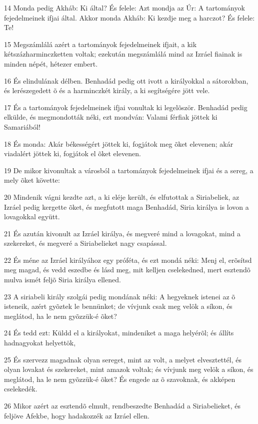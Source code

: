 \par 14 Monda pedig Akháb: Ki által? És felele: Azt mondja az Úr: A tartományok fejedelmeinek ifjai által. Akkor monda Akháb: Ki kezdje meg a harczot? És felele: Te!
\par 15 Megszámlálá azért a tartományok fejedelmeinek ifjait, a kik kétszázharminczketten voltak; ezekután megszámlálá mind az Izráel fiainak is minden népét, hétezer embert.
\par 16 És elindulának délben. Benhadád pedig ott ivott a királyokkal a sátorokban, és lerészegedett õ és a harminczkét király, a ki segítségére jött vele.
\par 17 És a tartományok fejedelmeinek ifjai vonultak ki legelõször. Benhadád pedig elkülde, és megmondották néki, ezt mondván: Valami férfiak jöttek ki Samariából!
\par 18 És monda: Akár békességért jöttek ki, fogjátok meg õket elevenen; akár viadalért jöttek ki, fogjátok el õket elevenen.
\par 19 De mikor kivonultak a városból a tartományok fejedelmeinek ifjai és a sereg, a mely õket követte:
\par 20 Mindenik vágni kezdte azt, a ki eléje került, és elfutottak a Siriabeliek, az Izráel pedig kergette õket, és megfutott maga Benhadád, Siria királya is lovon a lovagokkal együtt.
\par 21 És azután kivonult az Izráel királya, és megveré mind a lovagokat, mind a szekereket, és megveré a Siriabelieket nagy csapással.
\par 22 És méne az Izráel királyához egy próféta, és ezt mondá néki: Menj el, erõsítsd meg magad, és vedd eszedbe és lásd meg, mit kelljen cselekedned, mert esztendõ mulva ismét feljõ Siria királya ellened.
\par 23 A siriabeli király szolgái pedig mondának néki: A hegyeknek istenei az õ isteneik, azért gyõztek le bennünket; de vívjunk csak meg velök a síkon, és meglátod, ha le nem gyõzzük-é õket?
\par 24 És tedd ezt: Küldd el a királyokat, mindeniket a maga helyérõl; és állíts hadnagyokat helyettök,
\par 25 És szervezz magadnak olyan sereget, mint az volt, a melyet elvesztettél, és olyan lovakat és szekereket, mint amazok voltak; és vívjunk meg velök a síkon, és meglátod, ha le nem gyõzzük-é õket? És engede az õ szavoknak, és akképen cselekedék.
\par 26 Mikor azért az esztendõ elmult, rendbeszedte Benhadád a Siriabelieket, és feljöve Afekbe, hogy hadakozzék az Izráel ellen.
